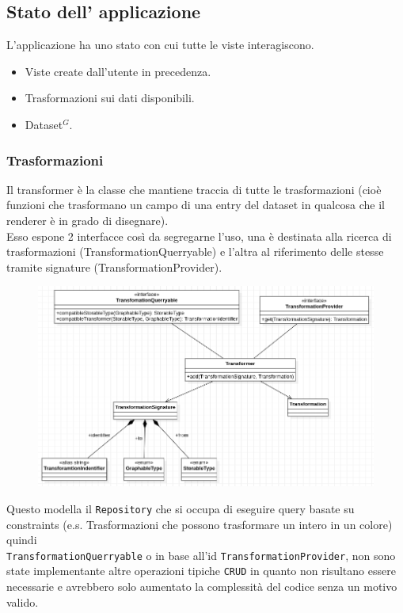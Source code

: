 \subsection{Stato dell' applicazione}
L'applicazione ha uno stato con cui tutte le viste interagiscono.
\begin{itemize}
  \item Viste create dall'utente in precedenza.
  \item Trasformazioni sui dati disponibili.
  \item Dataset$^{G}$.
\end{itemize}

\subsubsection{Trasformazioni}
Il transformer è la classe che mantiene traccia di tutte le trasformazioni (cioè
funzioni che trasformano un campo di una entry del dataset in qualcosa che il
renderer è in grado di disegnare). \\
Esso espone 2 interfacce così da segregarne l'uso, una è destinata alla ricerca di
trasformazioni (TransformationQuerryable) e l'altra al riferimento delle stesse tramite
signature (TransformationProvider). \\
\begin{figure}[H]
  \centering
  \includegraphics[scale=0.65]{../../assets/classi_uml/modeltransfomer.png}
\end{figure}
Questo modella il \texttt{Repository} che si occupa di eseguire query
basate su constraints (e.s. Trasformazioni che possono trasformare un intero
in un colore) quindi \\ \texttt{TransformationQuerryable} o in base all'id
\texttt{TransformationProvider}, non sono state implementante altre operazioni
tipiche \texttt{CRUD} in quanto non risultano essere necessarie e avrebbero
solo aumentato la complessità del codice senza un motivo valido.

